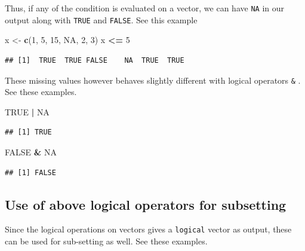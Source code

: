 \documentclass[
]{book}
\newenvironment{Shaded}{\begin{snugshade}}{\end{snugshade}}
\newcommand{\ConstantTok}[1]{\textcolor[rgb]{0.56,0.35,0.01}{#1}}
\newcommand{\DecValTok}[1]{\textcolor[rgb]{0.00,0.00,0.81}{#1}}
\newcommand{\FunctionTok}[1]{\textcolor[rgb]{0.13,0.29,0.53}{\textbf{#1}}}
\newcommand{\NormalTok}[1]{#1}
\newcommand{\OtherTok}[1]{\textcolor[rgb]{0.56,0.35,0.01}{#1}}
\newcommand{\SpecialCharTok}[1]{\textcolor[rgb]{0.81,0.36,0.00}{\textbf{#1}}}
\begin{document}
Thus, if any of the condition is evaluated on a vector, we can have \texttt{NA} in our output along with \texttt{TRUE} and \texttt{FALSE}. See this example

\begin{Shaded}
\begin{Highlighting}[]
\NormalTok{x }\OtherTok{\textless{}{-}} \FunctionTok{c}\NormalTok{(}\DecValTok{1}\NormalTok{, }\DecValTok{5}\NormalTok{, }\DecValTok{15}\NormalTok{, }\ConstantTok{NA}\NormalTok{, }\DecValTok{2}\NormalTok{, }\DecValTok{3}\NormalTok{)}
\NormalTok{x }\SpecialCharTok{\textless{}=} \DecValTok{5}
\end{Highlighting}
\end{Shaded}

\begin{verbatim}
## [1]  TRUE  TRUE FALSE    NA  TRUE  TRUE
\end{verbatim}

These missing values however behaves slightly different with logical operators \texttt{\&} \texttt{\textbar{}}. See these examples.

\begin{Shaded}
\begin{Highlighting}[]
\ConstantTok{TRUE} \SpecialCharTok{|} \ConstantTok{NA}
\end{Highlighting}
\end{Shaded}

\begin{verbatim}
## [1] TRUE
\end{verbatim}

\begin{Shaded}
\begin{Highlighting}[]
\ConstantTok{FALSE} \SpecialCharTok{\&} \ConstantTok{NA}
\end{Highlighting}
\end{Shaded}

\begin{verbatim}
## [1] FALSE
\end{verbatim}

\hypertarget{use-of-above-logical-operators-for-subsetting}{%
\subsection*{Use of above logical operators for subsetting}\label{use-of-above-logical-operators-for-subsetting}}

Since the logical operations on vectors gives a \texttt{logical} vector as output, these can be used for sub-setting as well. See these examples.
\end{document}
